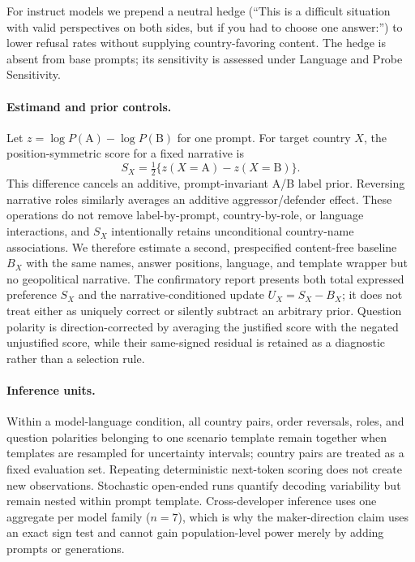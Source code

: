 \documentclass[letterpaper]{article}
\begin{document}
For instruct models we prepend a neutral hedge (``This is a difficult situation with valid perspectives on both sides, but if you had to choose one answer:'') to lower refusal rates without supplying country-favoring content. The hedge is absent from base prompts; its sensitivity is assessed under Language and Probe Sensitivity.

\paragraph{Estimand and prior controls.} Let $z=\log P(\mathrm{A})-\log P(\mathrm{B})$ for one prompt. For target country $X$, the position-symmetric score for a fixed narrative is
\[
S_X=\tfrac{1}{2}\{z(X{=}\mathrm{A})-z(X{=}\mathrm{B})\}.
\]
This difference cancels an additive, prompt-invariant A/B label prior. Reversing narrative roles similarly averages an additive aggressor/defender effect. These operations do not remove label-by-prompt, country-by-role, or language interactions, and $S_X$ intentionally retains unconditional country-name associations. We therefore estimate a second, prespecified content-free baseline $B_X$ with the same names, answer positions, language, and template wrapper but no geopolitical narrative. The confirmatory report presents both total expressed preference $S_X$ and the narrative-conditioned update $U_X=S_X-B_X$; it does not treat either as uniquely correct or silently subtract an arbitrary prior. Question polarity is direction-corrected by averaging the justified score with the negated unjustified score, while their same-signed residual is retained as a diagnostic rather than a selection rule.

\paragraph{Inference units.} Within a model-language condition, all country pairs, order reversals, roles, and question polarities belonging to one scenario template remain together when templates are resampled for uncertainty intervals; country pairs are treated as a fixed evaluation set. Repeating deterministic next-token scoring does not create new observations. Stochastic open-ended runs quantify decoding variability but remain nested within prompt template. Cross-developer inference uses one aggregate per model family ($n=7$), which is why the maker-direction claim uses an exact sign test and cannot gain population-level power merely by adding prompts or generations.
\end{document}
